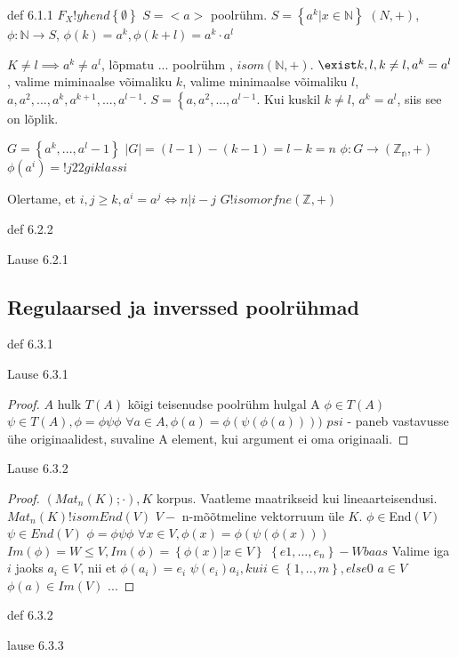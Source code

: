 \documentclass[12pt]{report}
\numberwithin{equation}{section}
\theoremstyle{definition}
\theoremstyle{plain}
\begin{document}
def 6.1.1
$F_X !yhend \left\lbrace \emptyset \right\rbrace$
$S = <a>$ poolr\"uhm.
$S = \left\lbrace a^k | x \in \mathbb{N} \right\rbrace $
$(N, +)$, $\phi : \mathbb{N} \to S$, $\phi(k) = a^k,\phi(k+l) = a^k \cdot a^l$

$K \neq l \implies a^k \neq a^l$, lõpmatu ... poolr\"uhm , $isom (\mathbb{N},+)$.
$\exist k,l, k \neq l, a^k = a^l$, valime miminaalse võimaliku $k$, valime minimaalse võimaliku $l$, $a,a^2,...,a^k, a^{k+1},...,a^{l-1}$. $S = \left\lbrace a,a^2,...,a^{l-1}$. Kui kuskil $k \neq l$, $a^k = a^l$, siis see on lõplik.

$G = \left\lbrace a^k,...,a^l-1 \right\rbrace$
$|G| = (l-1) - (k-1) = l-k  = n$
$\phi : G \to (\mathbb{Z_n},+)$
$\phi(a^i) = !j22giklass i$

Olertame, et $i,j \geq k, a^i = a^j \iff n | i-j$
$G !isomorfne (\mathbb{Z},+)$

def 6.2.2

Lause 6.2.1

\subsection{Regulaarsed ja inverssed poolr\"uhmad}

def 6.3.1

Lause 6.3.1

\begin{proof}
$A$ hulk
$T(A)$ kõigi teisenudse poolr\"uhm hulgal A
$\phi \in T(A)$
$\psi \in T(A), \phi = \phi \psi \phi$
$\forall a \in A, \phi(a) = \phi(\psi(\phi(a))))$
$psi$ - paneb vastavusse \"uhe originaalidest, suvaline A element, kui argument ei oma originaali.
\end{proof}

Lause 6.3.2

\begin{proof}
$(Mat_{n} (K); \cdot), K$ korpus.
Vaatleme maatrikseid kui lineaarteisendusi. 
$Mat_{n} (K) !isom End(V)$
$V -$ n-mõõtmeline vektorruum \"ule $K$.
$\phi \in $End$(V)$
$\psi \in End(V)$
$\phi = \phi \psi \phi$
$\forall x \in V, \phi(x) = \phi( \psi ( \phi (x)))$
$Im(\phi) = W \leq V, Im(\phi) = \left\lbrace \phi(x) | x \in V \right\rbrace $
$\left\lbrace e1,...,e_n \right\rbrace - W baas$
Valime iga $i$ jaoks $a_i \in V$, nii et $\phi(a_i) = e_i$
$\psi(e_i) a_i, kui i \in \left\lbrace 1,..,m \right\rbrace, else 0$
$a \in V$
$\phi(a) \in Im (V)$
...
\end{proof}

def 6.3.2

lause 6.3.3
\end{document}

